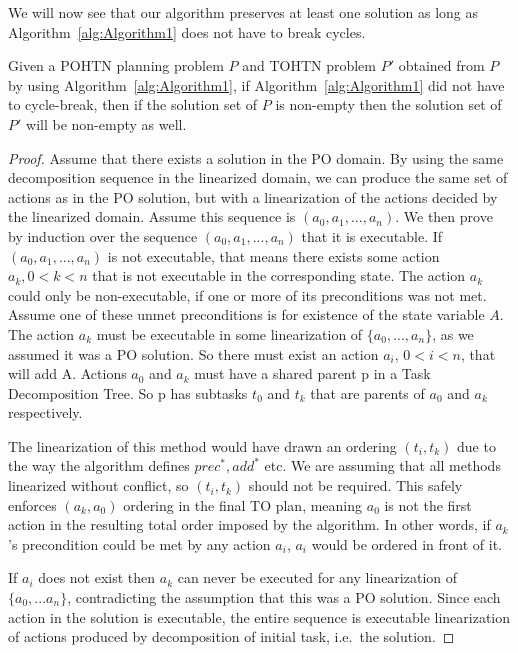 We will now see that our algorithm preserves at least one solution as long as Algorithm~\ref{alg:Algorithm1} does not have to break cycles.
\begin{theorem}\label{thm:SpecialCase}
	Given a POHTN planning problem $P$ and TOHTN problem
	$P'$ obtained from $P$ by using Algorithm~\ref{alg:Algorithm1}, if Algorithm~\ref{alg:Algorithm1} did not have to
	cycle-break, then if the solution set of $P$ is non-empty then the solution set of $P'$ will be non-empty as well.
\end{theorem}
\begin{proof}
	Assume that there exists a solution in the PO domain. By using the same decomposition sequence in the linearized domain, we can produce the same set of actions as in the PO solution, but with a linearization of the actions decided by the linearized domain. Assume this sequence is $(a_0, a_1, ..., a_n)$. We then prove by induction over the sequence $(a_0, a_1, ..., a_n)$ that it is executable.
	If $(a_0, a_1, ..., a_n)$ is not executable, that means there exists some action $a_k,  0 < k < n$ that is not executable in the corresponding state. The action $a_k$ could only be non-executable, if one or more of its preconditions was not met. Assume one of these unmet preconditions is for existence of the state variable $A$.
	The action $a_k$ must be executable in some linearization of $\{a_0, ..., a_n\}$, as we assumed it was a PO solution. So there must exist an action $a_i$, $0 < i < n$, that will add A. Actions $a_0$ and $a_k$ must have a shared parent p in a Task Decomposition Tree. So p has subtasks $t_0$ and $t_k$ that are parents of $a_0$ and $a_k$ respectively. 
	
	The linearization of this method would have drawn an ordering $(t_i, t_k)$ due to the way the algorithm defines $prec^{*}, add^{*}$ etc. We are assuming that all methods linearized without conflict, so $(t_i, t_k)$ should not be required. This safely enforces $(a_k, a_0)$ ordering in the final TO plan, meaning $a_0$ is not the first action in the resulting total order imposed by the algorithm. In other words, if $a_k$’s precondition could be met by any action $a_i$, $a_i$ would be ordered in front of it. 
	
	If $a_i$ does not exist then $a_k$ can never be executed for any linearization of $\{a_0, ...a_n\}$, contradicting the assumption that this was a PO solution. Since each action in the solution is executable, the entire sequence is executable linearization of actions produced by decomposition of initial task, i.e.\ the solution.
\end{proof}

